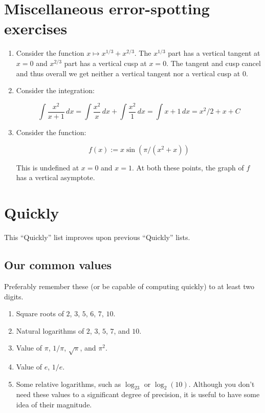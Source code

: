 \documentclass[10pt]{amsart}
\begin{document}
\section{Miscellaneous error-spotting exercises}

\begin{enumerate}
\item Consider the function $x \mapsto x^{1/3} + x^{2/3}$. The
  $x^{1/3}$ part has a vertical tangent at $x = 0$ and $x^{2/3}$ part
  has a vertical cusp at $x = 0$. The tangent and cusp cancel and thus
  overall we get neither a vertical tangent nor a vertical cusp at
  $0$.
\item Consider the integration:

  $$\int \frac{x^2}{x + 1} \, dx = \int \frac{x^2}{x} \, dx + \int \frac{x^2}{1} \, dx = \int x + 1 \, dx = x^2/2 + x + C$$
\item Consider the function:

  $$f(x) := x \sin (\pi/(x^2 + x))$$

  This is undefined at $x = 0$ and $x = 1$. At both these points, the
  graph of $f$ has a vertical asymptote.
\end{enumerate}




\section{Quickly}

This ``Quickly'' list improves upon previous ``Quickly'' lists.

\subsection{Our common values}

Preferably remember these (or be capable of computing quickly) to at
least two digits.

\begin{enumerate}
\item Square roots of $2$, $3$, $5$, $6$, $7$, $10$.
\item Natural logarithms of $2$, $3$, $5$, $7$, and $10$.
\item Value of $\pi$, $1/\pi$, $\sqrt{\pi}$, and $\pi^2$.
\item Value of $e$, $1/e$.
\item Some relative logarithms, such as $\log_23$ or
  $\log_2(10)$. Although you don't need these values to a significant
  degree of precision, it is useful to have some idea of their
  magnitude.
\end{enumerate}
\end{document}
